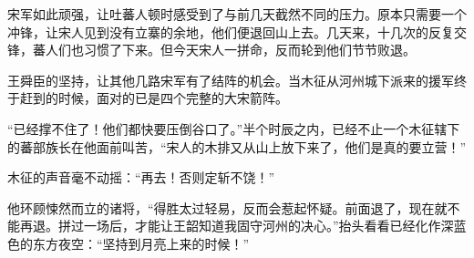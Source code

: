 宋军如此顽强，让吐蕃人顿时感受到了与前几天截然不同的压力。原本只需要一个冲锋，让宋人见到没有立寨的余地，他们便退回山上去。几天来，十几次的反复交锋，蕃人们也习惯了下来。但今天宋人一拼命，反而轮到他们节节败退。

王舜臣的坚持，让其他几路宋军有了结阵的机会。当木征从河州城下派来的援军终于赶到的时候，面对的已是四个完整的大宋箭阵。

“已经撑不住了！他们都快要压倒谷口了。”半个时辰之内，已经不止一个木征辖下的蕃部族长在他面前叫苦，“宋人的木排又从山上放下来了，他们是真的要立营！”

木征的声音毫不动摇：“再去！否则定斩不饶！”

他环顾悚然而立的诸将，“得胜太过轻易，反而会惹起怀疑。前面退了，现在就不能再退。拼过一场后，才能让王韶知道我固守河州的决心。”抬头看看已经化作深蓝色的东方夜空：“坚持到月亮上来的时候！”

